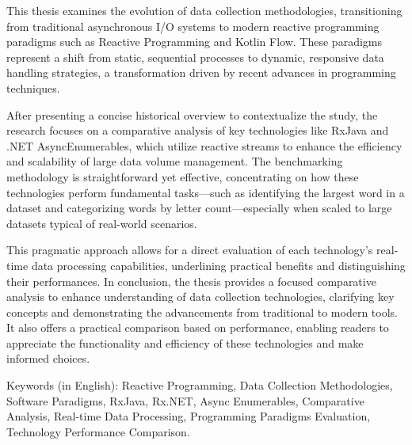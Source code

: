 \abstractEN %

This thesis examines the evolution of data collection methodologies, transitioning from traditional asynchronous I/O systems to modern reactive programming paradigms such as Reactive Programming and Kotlin Flow. These paradigms represent a shift from static, sequential processes to dynamic, responsive data handling strategies, a transformation driven by recent advances in programming techniques.

After presenting a concise historical overview to contextualize the study, the research focuses on a comparative analysis of key technologies like RxJava and .NET AsyncEnumerables, which utilize reactive streams to enhance the efficiency and scalability of large data volume management. The benchmarking methodology is straightforward yet effective, concentrating on how these technologies perform fundamental tasks—such as identifying the largest word in a dataset and categorizing words by letter count—especially when scaled to large datasets typical of real-world scenarios.

This pragmatic approach allows for a direct evaluation of each technology's real-time data processing capabilities, underlining practical benefits and distinguishing their performances. In conclusion, the thesis provides a focused comparative analysis to enhance understanding of data collection technologies, clarifying key concepts and demonstrating the advancements from traditional to modern tools. It also offers a practical comparison based on performance, enabling readers to appreciate the functionality and efficiency of these technologies and make informed choices.

\begin{keywords}
    Keywords (in English): Reactive Programming, Data Collection Methodologies, Software Paradigms, RxJava, Rx.NET, Async Enumerables, Comparative Analysis, Real-time Data Processing, Programming Paradigms Evaluation, Technology Performance Comparison.
\end{keywords}
